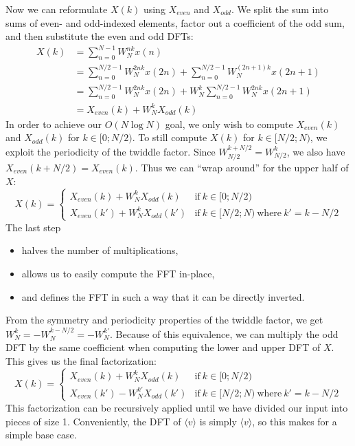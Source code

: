 Now we can reformulate $X(k)$ using $X_\textit{even}$ and $X_\textit{odd}$.
We split the sum into sums of even- and odd-indexed elements,
factor out a coefficient of the odd sum,
and then substitute the even and odd DFTs:
\begin{align}
    X(k) &= \sum_{n = 0}^{N - 1} W_N^{nk} x(n) \\
    &= \sum_{n = 0}^{N/2 - 1} W_N^{2nk} x(2n) + \sum_{n = 0}^{N/2 - 1} W_N^{(2n + 1)k} x(2n + 1) \\
    &= \sum_{n = 0}^{N/2 - 1} W_N^{2nk} x(2n) + W_N^k \sum_{n = 0}^{N/2 - 1} W_N^{2nk} x(2n + 1) \\
    &= X_\textit{even}(k) + W_N^k X_\textit{odd}(k)
\end{align}
%
In order to achieve our $O(N \log N)$ goal,
we only wish to compute $X_\textit{even}(k)$ and $X_\textit{odd}(k)$ for $k \in [0;N/2)$.
To still compute $X(k)$ for $k \in [N/2;N)$, we exploit the periodicity of the twiddle factor.
Since $W_{N/2}^{k + N/2} = W_{N/2}^k$, we also have $X_\textit{even}(k + N/2) = X_\textit{even}(k)$.
Thus we can ``wrap around'' for the upper half of $X$:
\begin{equation}
    X(k) =
    \begin{cases}
        X_\textit{even}(k) + W_N^k X_\textit{odd}(k) &\text{if}~k \in [0;N/2) \\
        X_\textit{even}(k') + W_N^{k} X_\textit{odd}(k') &\text{if}~k \in [N/2;N) ~\text{where}~k' = k - N/2
    \end{cases}
\end{equation}
%
The last step
\begin{itemize}
    \item halves the number of multiplications,
    \item allows us to easily compute the FFT in-place,
    \item and defines the FFT in such a way that it can be directly inverted.
\end{itemize}

From the symmetry and periodicity properties of the twiddle factor,
we get $W_N^k = -W_N^{k - N/2} = -W_N^{k'}$.
Because of this equivalence,
we can multiply the odd DFT by the same coefficient when computing the lower and upper DFT of $X$.
This gives us the final factorization:
\begin{equation}
    X(k) =
    \begin{cases}
        X_\textit{even}(k) + W_N^k X_\textit{odd}(k) &\text{if}~k \in [0;N/2) \\
        X_\textit{even}(k') - W_N^{k'} X_\textit{odd}(k') &\text{if}~k \in [N/2;N) ~\text{where}~k' = k - N/2
    \end{cases}
\end{equation}
This factorization can be recursively applied
until we have divided our input into pieces of size 1.
Conveniently, the DFT of $\langle v \rangle$ is simply $\langle v \rangle$,
so this makes for a simple base case.

